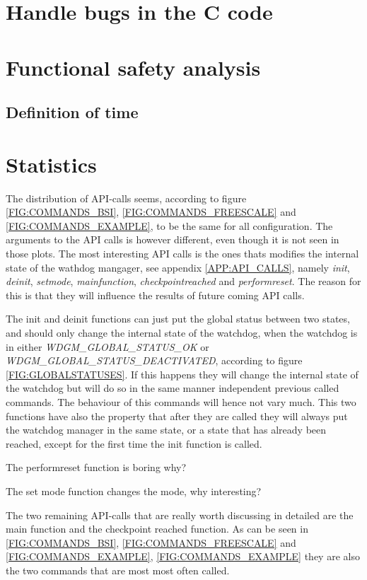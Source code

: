\section{Handle bugs in the C code}
\label{sec:handlebugs}


\section{Functional safety analysis}
\subsection{Definition of time}
\label{SEC:FUNCTIONAL_SAFETY_TIME}

\section{Statistics}
The distribution of API-calls seems, according to figure
\ref{FIG:COMMANDS_BSI}, \ref{FIG:COMMANDS_FREESCALE} and
\ref{FIG:COMMANDS_EXAMPLE}, to be the same for all configuration. The arguments
to the API calls is however different, even though it is not seen in those plots.
The most interesting API calls is the ones thats modifies the internal state of
the wathdog mangager, see appendix \ref{APP:API_CALLS}, namely \emph{init},
\emph{deinit}, \emph{setmode}, \emph{mainfunction},
\emph{checkpointreached} and \emph{performreset}. The reason for this is that
they will influence the results of future coming API calls.

The init and deinit functions can just put the global
status between two states, and should only change the internal state of the
watchdog, when the watchdog is in either \emph{WDGM\_GLOBAL\_STATUS\_OK}
or \emph{WDGM\_GLOBAL\_STATUS\_DEACTIVATED}, according to
figure \ref{FIG:GLOBALSTATUSES}. If this happens they will change the internal
state of the watchdog but will do so in the same manner independent previous
called commands. The behaviour of this commands will hence not vary much.
This two functions have also the property that after they are called they will
always put the watchdog manager in the same state, or a state that has already
been reached, except for the first time the init function is called.

The performreset function is boring why?

The set mode function changes the mode, why interesting?

The two remaining API-calls that are really worth discussing in detailed are the
main function and the checkpoint reached function. As can be seen in
\ref{FIG:COMMANDS_BSI}, \ref{FIG:COMMANDS_FREESCALE} and \ref{FIG:COMMANDS_EXAMPLE},
\ref{FIG:COMMANDS_EXAMPLE} they are also the two commands that are most most
often called.

